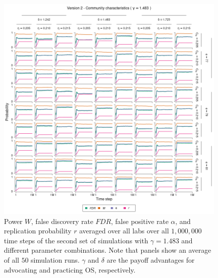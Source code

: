 \documentclass[meta, authordate]{jote-new-article}
\begin{document}
\begin{figure}
  \begin{fullwidth}
    \centering
    \includegraphics[width=\textwidth]{v2_cha_plot_sens_payypro1.483.png}
    \caption{Power $W$, false discovery rate $FDR$, false positive rate $\alpha$, and replication probability $r$ averaged over all labs over all $1,000,000$ time steps of the second set of simulations with $\gamma=1.483$ and different parameter combinations. Note that panels show an average of all $50$ simulation runs. $\gamma$ and $\delta$ are the payoff advantages for advocating and practicing OS, respectively.}
    \label{fig:v2_cha_plot_sens_payypro1.483}
  \end{fullwidth}
\end{figure}
%
%
\end{document}
